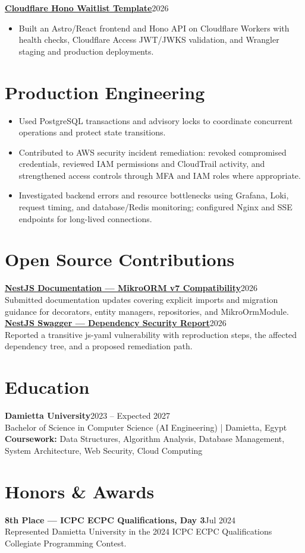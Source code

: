 \documentclass[a4paper,10pt]{article}
\newcommand{\project}[3]{\textbf{\href{#2}{#1}}\hfill #3\par}
\begin{document}
\project{Cloudflare Hono Waitlist Template}{https://github.com/Abdalrahman-Amr-Dev/cloudflare-hono-waitlist-template}{2026}
\begin{itemize}
\item Built an Astro/React frontend and Hono API on Cloudflare Workers with health checks, Cloudflare Access JWT/JWKS validation, and Wrangler staging and production deployments.
\end{itemize}

\section{Production Engineering}
\begin{itemize}
\item Used PostgreSQL transactions and advisory locks to coordinate concurrent operations and protect state transitions.
\item Contributed to AWS security incident remediation: revoked compromised credentials, reviewed IAM permissions and CloudTrail activity, and strengthened access controls through MFA and IAM roles where appropriate.
\item Investigated backend errors and resource bottlenecks using Grafana, Loki, request timing, and database/Redis monitoring; configured Nginx and SSE endpoints for long-lived connections.
\end{itemize}

\section{Open Source Contributions}
\textbf{\href{https://github.com/nestjs/docs.nestjs.com/pull/3497}{NestJS Documentation --- MikroORM v7 Compatibility}}\hfill 2026\\
Submitted documentation updates covering explicit imports and migration guidance for decorators, entity managers, repositories, and MikroOrmModule.\\[3pt]
\textbf{\href{https://github.com/nestjs/swagger/issues/4038}{NestJS Swagger --- Dependency Security Report}}\hfill 2026\\
Reported a transitive js-yaml vulnerability with reproduction steps, the affected dependency tree, and a proposed remediation path.

\section{Education}
\textbf{Damietta University}\hfill 2023 -- Expected 2027\\
Bachelor of Science in Computer Science (AI Engineering) | Damietta, Egypt\\
\textbf{Coursework:} Data Structures, Algorithm Analysis, Database Management, System Architecture, Web Security, Cloud Computing

\section{Honors \& Awards}
\textbf{8th Place --- ICPC ECPC Qualifications, Day 3}\hfill Jul 2024\\
Represented Damietta University in the 2024 ICPC ECPC Qualifications Collegiate Programming Contest.
\end{document}
